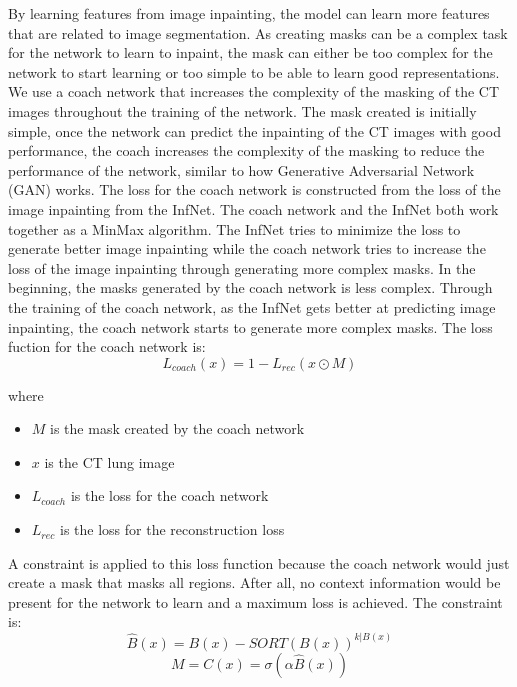 By learning features from image inpainting, the model can learn more features that are related to image segmentation. As creating masks can be a complex task for the network to learn to inpaint, the mask can either be too complex for the network to start learning or too simple to be able to learn good representations. We use a coach network that increases the complexity of the masking of the CT images throughout the training of the network. The mask created is initially simple, once the network can predict the inpainting of the CT images with good performance, the coach increases the complexity of the masking to reduce the performance of the network, similar to how Generative Adversarial Network (GAN) works. The loss for the coach network is constructed from the loss of the image inpainting from the InfNet. The coach network and the InfNet both work together as a MinMax algorithm. The InfNet tries to minimize the loss to generate better image inpainting while the coach network tries to increase the loss of the image inpainting through generating more complex masks. In the beginning, the masks generated by the coach network is less complex. Through the training of the coach network, as the InfNet gets better at predicting image inpainting, the coach network starts to generate more complex masks. The loss fuction for the coach network is:
\begin{equation}
L_{coach}(x) = 1 - L_{rec}(x\odot M)
\end{equation}

where 
\begin{itemize}
	\item $M$ is the mask created by the coach network
	\item $x$ is the CT lung image
	\item $L_{coach}$ is the loss for the coach network
	\item $L_{rec}$ is the loss for the reconstruction loss
\end{itemize} A constraint is applied to this loss function because the coach network would just create a mask that masks all regions. After all, no context information would be present for the network to learn and a maximum loss is achieved. The constraint is:
\begin{equation}
\hat{B}(x) = B(x) - SORT(B(x))^{k|B(x)} 
\end{equation}
\begin{equation}
M = C(x) = \sigma (\alpha \hat{B}(x))
\end{equation}

